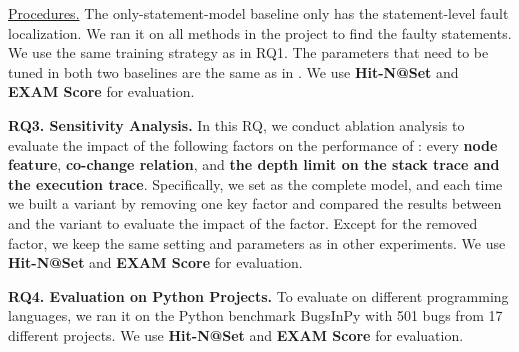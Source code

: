 
\underline{Procedures.}
The only-statement-model baseline only has the statement-level fault
localization. We ran it on all methods in the project to find the
faulty statements. We use the same training strategy as in RQ1.  The
parameters that need to be tuned in both two baselines are the same as
in {\tool}. We use \textbf{Hit-N@Set} and \textbf{EXAM Score} for
evaluation.

{\bf RQ3. Sensitivity Analysis.}  In this RQ, we conduct ablation
analysis to evaluate the impact of the following factors on the
performance of {\tool}: every {\bf node feature}, {\bf co-change
relation}, and {\bf the depth limit on the stack trace and the
execution trace}. Specifically, we set \tool as the complete model,
and each time we built a variant by removing one key factor and
compared the results between {\tool} and the variant to evaluate
the impact of the factor. Except for the removed factor, we keep the
same setting and parameters as in other experiments. We
use \textbf{Hit-N@Set} and \textbf{EXAM Score} for evaluation.

{\bf RQ4. Evaluation on Python Projects.}
%
To evaluate {\tool} on different programming languages, we ran it on the Python benchmark BugsInPy \cite{BugsInPy,widyasari2020bugsinpy} with 501 bugs from 17 different projects. We use \textbf{Hit-N@Set} and \textbf{EXAM Score} for evaluation.
